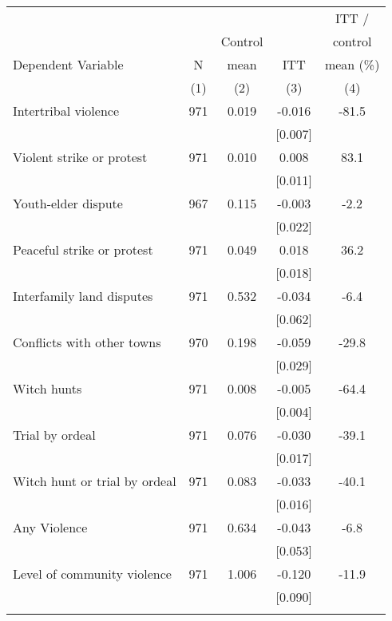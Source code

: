 \begin{tabular}{lcccc}
\hline \noalign{\smallskip} &  &  &  & ITT /\\
 &  & Control &  & control\\
Dependent Variable & N & mean & ITT & mean (\%)\\
 & (1) & (2) & (3) & (4)\\
\noalign{\smallskip}\hline \noalign{\smallskip}\quad Intertribal violence & 971 & 0.019 & -0.016 & -81.5\\
 &  &  & [0.007] & \\
\quad Violent strike or protest & 971 & 0.010 & 0.008 & 83.1\\
 &  &  & [0.011] & \\
\quad Youth-elder dispute & 967 & 0.115 & -0.003 & -2.2\\
 &  &  & [0.022] & \\
\quad Peaceful strike or protest & 971 & 0.049 & 0.018 & 36.2\\
 &  &  & [0.018] & \\
\quad Interfamily land disputes & 971 & 0.532 & -0.034 & -6.4\\
 &  &  & [0.062] & \\
\quad Conflicts with other towns & 970 & 0.198 & -0.059 & -29.8\\
 &  &  & [0.029] & \\
\quad Witch hunts & 971 & 0.008 & -0.005 & -64.4\\
 &  &  & [0.004] & \\
\quad Trial by ordeal & 971 & 0.076 & -0.030 & -39.1\\
 &  &  & [0.017] & \\
\quad Witch hunt or trial by ordeal & 971 & 0.083 & -0.033 & -40.1\\
 &  &  & [0.016] & \\
Any Violence & 971 & 0.634 & -0.043 & -6.8\\
 &  &  & [0.053] & \\
Level of community violence & 971 & 1.006 & -0.120 & -11.9\\
 &  &  & [0.090] & \\
\noalign{\smallskip}\hline\end{tabular}

